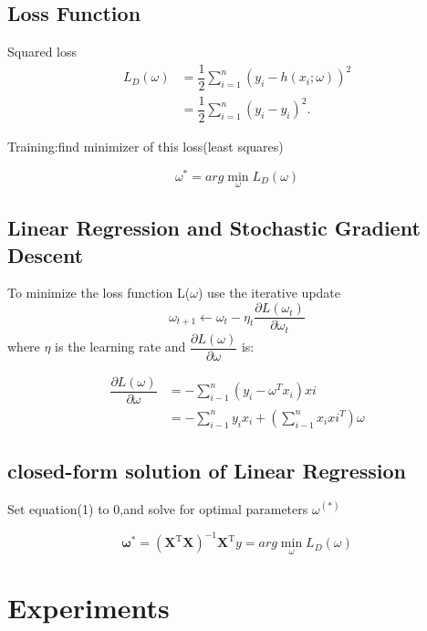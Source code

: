 \documentclass[journal, a4paper]{IEEEtran}
\begin{document}
\subsection{Loss Function}
Squared loss
\begin{equation}
\begin{aligned}
L_{D}(\omega)&=\dfrac{1}{2}\sum_{i=1}^{n}(y_{i}-h(x_{i};\omega))^{2}\\&=\dfrac{1}{2}\sum_{i=1}^{n}(y_{i}-\widehat{y_{i}})^{2}.
\end{aligned}
\end{equation}
\begin{flushleft}
Training:find minimizer of this loss(least squares)
\end{flushleft}
$$\omega^{*}=arg\min_{\omega}L_{D}(\omega)$$	
\subsection{Linear Regression and Stochastic Gradient Descent}
\begin{flushleft}			
To minimize the loss function L($\omega$) use the iterative update
\begin{equation}
\omega_{t+1}\leftarrow\omega_{t}-\eta_{t}\dfrac{\partial L(\omega_{t})}{\partial\omega_{t}}
\end{equation}
where $\eta$ is the learning rate and $\dfrac{\partial L(\omega)}{\partial\omega}$ is:
\end{flushleft}
\begin{equation}
\begin{aligned}
\dfrac{\partial L(\omega)}{\partial\omega}&=-\sum_{i-1}^{n}(y_{i}-\omega^{T}x_{i})x{i}\\&=-\sum_{i-1}^{n}y_{i}x_{i}+(\sum_{i-1}^{n}x_{i}x{i}^{T})\omega
\end{aligned}
\end{equation}
\subsection{closed-form solution of Linear Regression }
\begin{flushleft}
Set equation(1) to 0,and solve for optimal parameters $\omega^(*)$
\end{flushleft}
$$\mathbf{\omega}^\mathrm{*}=(\mathbf{X}^\mathrm{T}\mathbf{X})^{-1}\mathbf{X}^\mathrm{T}y=arg\min_{\omega}L_{D}(\omega)$$

\section{Experiments}
\end{document}
